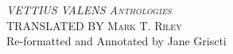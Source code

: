 \begin{titlingpage}
\centering
{\Huge\scshape \textsl{VETTIUS VALENS Anthologies}\\ [1in]}
{\small\scshape TRANSLATED BY Mark T. Riley} \\
{\tiny Re-formatted and Annotated by Jane Griscti}
\end{titlingpage}